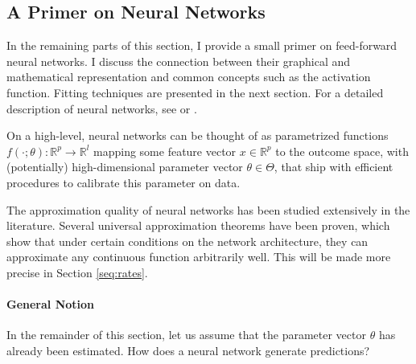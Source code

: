 \subsection{A Primer on Neural Networks}

In the remaining parts of this section, I provide a small primer on feed-forward neural
networks. I discuss the connection between their graphical and mathematical
representation and common concepts such as the activation function. Fitting techniques
are presented in the next section. For a detailed description of neural networks, see
\cite{Goodfellow.2016, Murphy.2012} or \cite{Hastie.2008}.

On a high-level, neural networks can be thought of as parametrized functions $f(\cdot;
\theta):\mathbb{R}^p \to \mathbb{R}^l$ mapping some feature vector $x \in \mathbb{R}^p$
to the outcome space, with (potentially) high-dimensional parameter vector $\theta \in
\Theta$, that ship with efficient procedures to calibrate this parameter on data.

The approximation quality of neural networks has been studied extensively in the
literature. Several universal approximation theorems have been proven, which show that
under certain conditions on the network architecture, they can approximate any
continuous function arbitrarily well. This will be made more precise in Section
\ref{seq:rates}.

\paragraph{General Notion}

In the remainder of this section, let us assume that the parameter vector $\theta$
has already been estimated. How does a neural network generate predictions?

